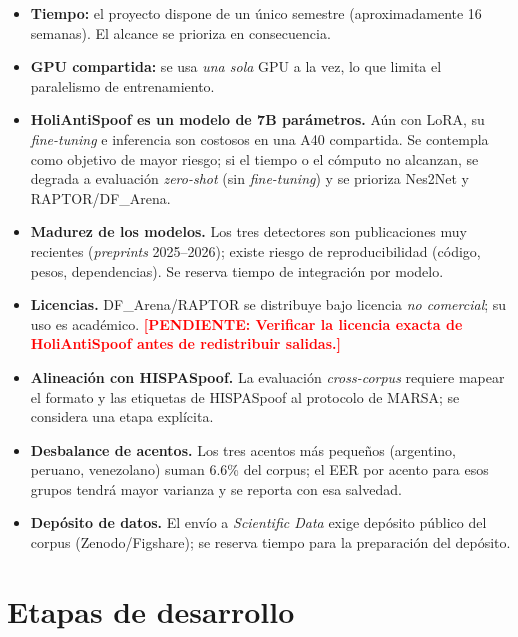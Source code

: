 \documentclass[11pt]{article}
\newcommand{\PENDIENTE}[1]{\textcolor{red}{\textbf{[PENDIENTE: #1]}}}
\begin{document}
\begin{itemize}[leftmargin=1.2em]
  \item \textbf{Tiempo:} el proyecto dispone de un \'unico semestre
  (aproximadamente 16 semanas). El alcance se prioriza en consecuencia.
  \item \textbf{GPU compartida:} se usa \emph{una sola} GPU a la vez, lo
  que limita el paralelismo de entrenamiento.
  \item \textbf{HoliAntiSpoof es un modelo de 7B par\'ametros.} A\'un con
  LoRA, su \emph{fine-tuning} e inferencia son costosos en una A40
  compartida. Se contempla como objetivo de mayor riesgo; si el tiempo o
  el c\'omputo no alcanzan, se degrada a evaluaci\'on \emph{zero-shot}
  (sin \emph{fine-tuning}) y se prioriza Nes2Net y RAPTOR/DF\_Arena.
  \item \textbf{Madurez de los modelos.} Los tres detectores son
  publicaciones muy recientes (\emph{preprints} 2025--2026); existe riesgo
  de reproducibilidad (c\'odigo, pesos, dependencias). Se reserva tiempo
  de integraci\'on por modelo.
  \item \textbf{Licencias.} DF\_Arena/RAPTOR se distribuye bajo licencia
  \emph{no comercial}; su uso es acad\'emico. \PENDIENTE{Verificar la
  licencia exacta de HoliAntiSpoof antes de redistribuir salidas.}
  \item \textbf{Alineaci\'on con HISPASpoof.} La evaluaci\'on
  \emph{cross-corpus} requiere mapear el formato y las etiquetas de
  HISPASpoof al protocolo de MARSA; se considera una etapa expl\'icita.
  \item \textbf{Desbalance de acentos.} Los tres acentos m\'as peque\~nos
  (argentino, peruano, venezolano) suman 6.6\% del corpus; el EER por
  acento para esos grupos tendr\'a mayor varianza y se reporta con esa
  salvedad.
  \item \textbf{Dep\'osito de datos.} El env\'io a \emph{Scientific Data}
  exige dep\'osito p\'ublico del corpus (Zenodo/Figshare); se reserva
  tiempo para la preparaci\'on del dep\'osito.
\end{itemize}

\section{Etapas de desarrollo}
\end{document}
